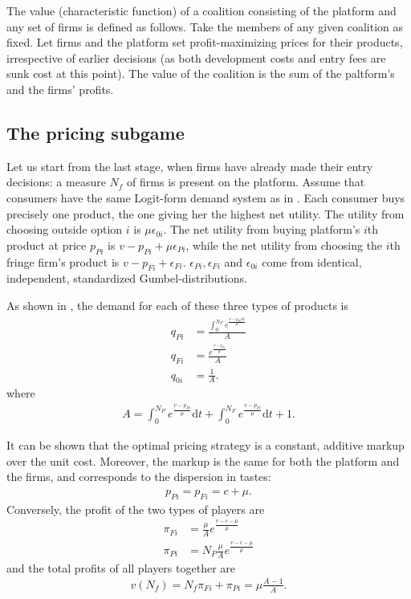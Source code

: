 \documentclass[a4paper]{article}
\newcommand{\dt}{\mathrm{d}t}
\newcommand{\di}{\mathrm{d}i}
\begin{document}
The value (characteristic function) of a coalition consisting of the platform and any set of firms is defined as follows. Take the members of any given coalition as fixed. Let firms and the platform set profit-maximizing prices for their products, irrespective of earlier decisions (as both development costs and entry fees are sunk cost at this point). The value of the coalition is the sum of the paltform's and the firms' profits.

\subsection{The pricing subgame}

Let us start from the last stage, when firms have already made their entry decisions: a measure $N_f$ of firms is present on the platform. Assume that consumers have the same Logit-form demand system as in \textcite{anderson2021hybrid}. Each consumer buys precisely one product, the one giving her the highest net utility. The utility from choosing outside option $i$ is $\mu \epsilon_{0i}$. The net utility from buying platform's $i$th product at price $p_{Pi}$ is $v - p_{Pi} + \mu \epsilon_{Pi}$, while the net utility from choosing the $i$th fringe firm's product is $v - p_{Fi} + \epsilon_{Fi}$. $\epsilon_{Pi}, \epsilon_{Fi}$ and $\epsilon_{0i}$ come from identical, independent, standardized Gumbel-distributions.

As shown in \textcite{anderson2021hybrid}, the demand for each of these three types of products is
\begin{align*}
    q_{Pi} &= \frac{\int_0^{N_P}  e^\frac{v - p_{Pi} \di}{\mu}}{A} \\
    q_{Fi} &= \frac{e^\frac{v - p_{Fi}}{\mu}}{A} \\
    q_{0i} &= \frac{1}{A} .
\end{align*}
where
\begin{align*}
    A = \int_0^{N_P} e^\frac{v - p_{Pi}}{\mu} \dt + \int_0^{N_F} e^\frac{v - p_{Fi}}{\mu} \dt + 1.
\end{align*}

It can be shown that the optimal pricing strategy is a constant, additive markup over the unit cost. Moreover, the markup is the same for both the platform and the firms, and corresponds to the dispersion in tastes:
\begin{align*}
    p_{Pi} = p_{Fi} = c + \mu.
\end{align*}
Conversely, the profit of the two types of players are
\begin{align*}
    \pi_{Fi} &= \frac{\mu}{A} e^\frac{v - c - \mu}{\mu} \\
    \pi_{Pi} &= N_P \frac{\mu}{A} e^\frac{v - c - \mu}{\mu}
\end{align*}
and the total profits of all players together are
\begin{align*}
    v(N_f) = N_f \pi_{Fi} + \pi_{Pi} = \mu \frac{A - 1}{A}.
\end{align*}
\end{document}
